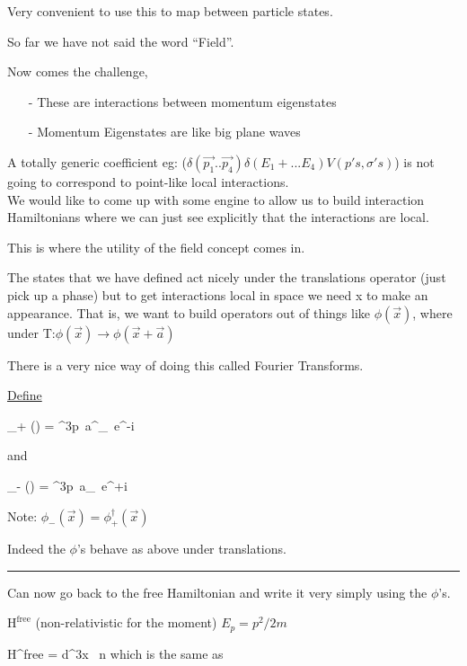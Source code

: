 {Very convenient to use this to map between particle states.

So far we have not said the word ``Field''. 

Now comes the challenge, 
\begin{itemize}
\item[-] These are interactions between momentum eigenstates
\item[-] Momentum Eigenstates are like big plane waves
\end{itemize}

A totally generic coefficient eg: ($\delta(\vec{p_1}..\vec{p_4}) \delta(E_1 + ... E_4) V(p's, \sigma's)$) is not going to correspond to point-like local interactions.\\

We would like to come up with some engine to allow us to build interaction Hamiltonians where we can just see explicitly that the interactions are local. 
\bi
\item[-]This is where the utility of the field concept comes in. \\
\ei

The states that we have defined act nicely under the translations operator (just pick up a phase) but to get interactions local in space we need x to make an appearance. 
That is, we want to build operators out of things like $\phi(\vec{x})$, where under T:$\phi(\vec{x}) \rightarrow \phi(\vec{x}+\vec{a})$


There is a very nice way of doing this called Fourier Transforms. 

\underline{Define}   

\be
\phi_+ () = \int {}^3p\ a^{\dagger}_{}\ e^{-i  }
\ee

and

\be
\phi_- () = \int {}^3p\ a_{}\ e^{+i  }
\ee

Note: $\phi_- (\vec{x}) = \phi^\dagger_+ (\vec{x})$

Indeed the $\phi$'s behave as above under translations.

\noindent\rule{\textwidth}{1pt}

Can now go back to the free Hamiltonian and write it very simply using the $\phi$'s.


$\textrm{H}^{\textrm{free}}$ (non-relativistic for the moment) $E_p = p^2/2m$

\be
\textrm{H}^{\textrm{free}} = \int d^3x\ 
\ee
n
which is the same as 

}
